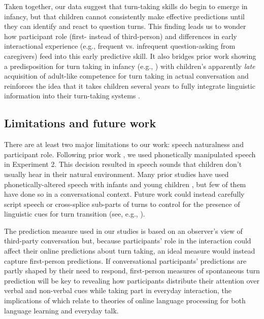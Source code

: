 \documentclass[authoryear, 12pt]{elsarticle}
\begin{document}
Taken together, our data suggest that turn-taking skills do begin to emerge in infancy, but that children cannot consistently make effective predictions until they can identify and react to question turns. This finding leads us to wonder how participant role (first- instead of third-person) and differences in early interactional experience (e.g., frequent vs. infrequent question-asking from caregivers) feed into this early predictive skill. It also bridges prior work showing a predisposition for turn taking in infancy (e.g., \citealp{bateson1975, hilbrink2015, jaffe2001, snow1977}) with children's apparently \textit{late} acquisition of adult-like competence for turn taking in actual conversation \citep{casillas2016, garvey1984, garvey1981, ervin-tripp1979} and reinforces the idea that it takes children several years to fully integrate linguistic information into their turn-taking systems \citep{casillas2016,garvey1981}.

\subsection*{Limitations and future work}

There are at least two major limitations to our work: speech naturalness and participant role. Following prior work \citep{de-ruiter2006, keitel2013}, we used phonetically manipulated speech in Experiment 2. This decision resulted in speech sounds that children don't usually hear in their natural environment. Many prior studies have used phonetically-altered speech with infants and young children \citep[cf.][]{jusczyk2000}, but few of them have done so in a conversational context. Future work could instead carefully script speech or cross-splice sub-parts of turns to control for the presence of linguistic cues for turn transition (see, e.g., \citealp{torreira2015}).

The prediction measure used in our studies is based on an observer's view of third-party conversation but, because participants' role in the interaction could affect their online predictions about turn taking, an ideal measure would instead capture first-person predictions. If conversational participants' predictions are partly shaped by their need to respond, first-person measures of spontaneous turn prediction will be key to revealing how participants distribute their attention over verbal and non-verbal cues while taking part in everyday interaction, the implications of which relate to theories of online language processing for both language learning and everyday talk.
\end{document}
